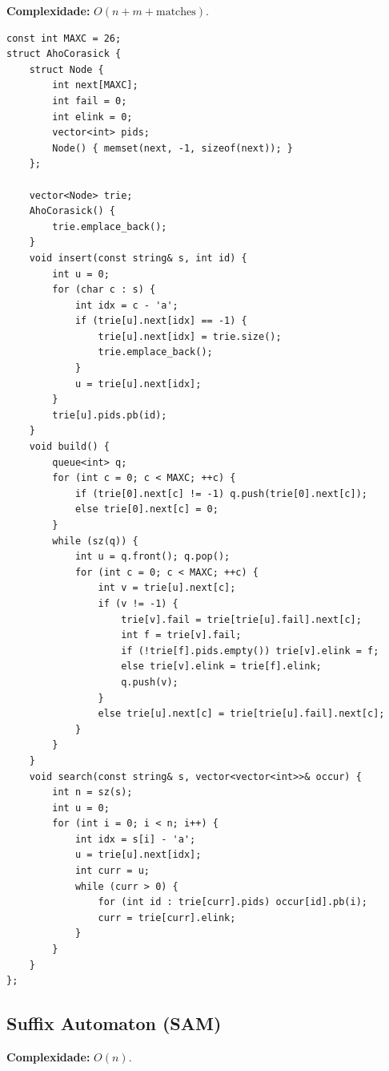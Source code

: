 \textbf{Complexidade:} $O(n + m + \text{matches})$.

\begin{lstlisting}
const int MAXC = 26;
struct AhoCorasick {
    struct Node {
        int next[MAXC];
        int fail = 0;
        int elink = 0;
        vector<int> pids;
        Node() { memset(next, -1, sizeof(next)); }
    };
 
    vector<Node> trie;
    AhoCorasick() {
        trie.emplace_back(); 
    }
    void insert(const string& s, int id) {
        int u = 0;
        for (char c : s) {
            int idx = c - 'a';
            if (trie[u].next[idx] == -1) {
                trie[u].next[idx] = trie.size();
                trie.emplace_back();
            }
            u = trie[u].next[idx];
        }
        trie[u].pids.pb(id);
    }
    void build() {
        queue<int> q;
        for (int c = 0; c < MAXC; ++c) {
            if (trie[0].next[c] != -1) q.push(trie[0].next[c]);
            else trie[0].next[c] = 0;
        }
        while (sz(q)) {
            int u = q.front(); q.pop();
            for (int c = 0; c < MAXC; ++c) {
                int v = trie[u].next[c];
                if (v != -1) {
                    trie[v].fail = trie[trie[u].fail].next[c];
                    int f = trie[v].fail;
                    if (!trie[f].pids.empty()) trie[v].elink = f;
                    else trie[v].elink = trie[f].elink;
                    q.push(v);
                } 
                else trie[u].next[c] = trie[trie[u].fail].next[c];
            }
        }
    }
    void search(const string& s, vector<vector<int>>& occur) {
        int n = sz(s);
        int u = 0;
        for (int i = 0; i < n; i++) {
            int idx = s[i] - 'a';
            u = trie[u].next[idx];
            int curr = u;
            while (curr > 0) {
                for (int id : trie[curr].pids) occur[id].pb(i);
                curr = trie[curr].elink;
            }
        }
    }
};
\end{lstlisting}


\subsection{Suffix Automaton (SAM)}

\textbf{Complexidade:} $O(n)$.

